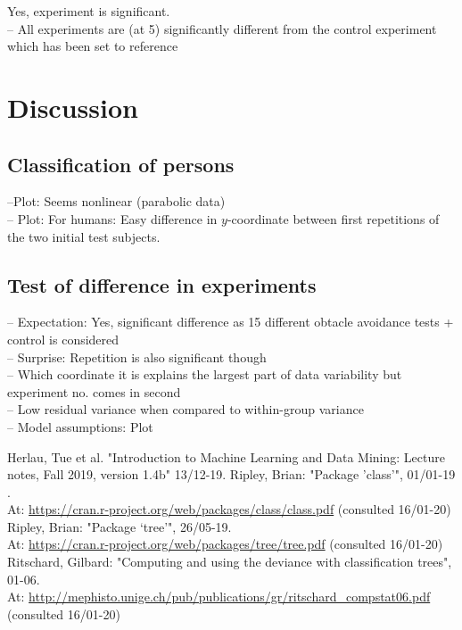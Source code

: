 \documentclass[12pt,fleqn]{article}
\begin{document}
Yes, experiment is significant.\\
	
-- All experiments are (at 5\pro) significantly different from the control experiment which has been set to reference

\section{Discussion}
\subsection{Classification of persons}
--Plot: Seems nonlinear (parabolic data)\\
-- Plot: For humans: Easy difference in \(y\)-coordinate between first repetitions of the two initial test subjects.

\subsection{Test of difference in experiments}
-- Expectation: Yes, significant difference as 15 different obtacle avoidance tests + control is considered\\
-- Surprise: Repetition is also significant though\\
-- Which coordinate it is explains the largest part of data variability but experiment no. comes in second\\
-- Low residual variance when compared to within-group variance\\
-- Model assumptions: Plot\\
\begin{thebibliography}{9}
	 Herlau, Tue et al. "Introduction to Machine Learning and Data Mining: Lecture notes, Fall 2019, version 1.4b" 13/12-19.
	 Ripley, Brian: "Package ’class’", 01/01-19 .\\
	At:
	\url{https://cran.r-project.org/web/packages/class/class.pdf} (consulted 16/01-20)
	 Ripley, Brian: "Package ‘tree’", 26/05-19.\\ At: \url{https://cran.r-project.org/web/packages/tree/tree.pdf} (consulted 16/01-20)
	 Ritschard, Gilbard: "Computing and using the deviance with classification trees", 01-06.\\
	 At:
	\url{http://mephisto.unige.ch/pub/publications/gr/ritschard_compstat06.pdf} (consulted 16/01-20)
\end{thebibliography}
\appendix
\end{document}
